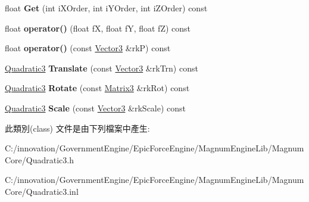 \begin{DoxyCompactItemize}
\item 
float {\bfseries Get} (int i\+X\+Order, int i\+Y\+Order, int i\+Z\+Order) const \hypertarget{class_i_dream_sky_1_1_quadratic3_a10728bfc6464745bdd09386a4bdb4a13}{}\label{class_i_dream_sky_1_1_quadratic3_a10728bfc6464745bdd09386a4bdb4a13}

\item 
float {\bfseries operator()} (float fX, float fY, float fZ) const \hypertarget{class_i_dream_sky_1_1_quadratic3_aca7c6466b899860b04295eeafb38caa7}{}\label{class_i_dream_sky_1_1_quadratic3_aca7c6466b899860b04295eeafb38caa7}

\item 
float {\bfseries operator()} (const \hyperlink{class_i_dream_sky_1_1_vector3}{Vector3} \&rkP) const \hypertarget{class_i_dream_sky_1_1_quadratic3_a3a4c43a7f7101155fb26da46d5a34a20}{}\label{class_i_dream_sky_1_1_quadratic3_a3a4c43a7f7101155fb26da46d5a34a20}

\item 
\hyperlink{class_i_dream_sky_1_1_quadratic3}{Quadratic3} {\bfseries Translate} (const \hyperlink{class_i_dream_sky_1_1_vector3}{Vector3} \&rk\+Trn) const \hypertarget{class_i_dream_sky_1_1_quadratic3_a91f3620744835c35b41366aa221a0971}{}\label{class_i_dream_sky_1_1_quadratic3_a91f3620744835c35b41366aa221a0971}

\item 
\hyperlink{class_i_dream_sky_1_1_quadratic3}{Quadratic3} {\bfseries Rotate} (const \hyperlink{class_i_dream_sky_1_1_matrix3}{Matrix3} \&rk\+Rot) const \hypertarget{class_i_dream_sky_1_1_quadratic3_adcbc9d302ba48b2dcef7afd119130e81}{}\label{class_i_dream_sky_1_1_quadratic3_adcbc9d302ba48b2dcef7afd119130e81}

\item 
\hyperlink{class_i_dream_sky_1_1_quadratic3}{Quadratic3} {\bfseries Scale} (const \hyperlink{class_i_dream_sky_1_1_vector3}{Vector3} \&rk\+Scale) const \hypertarget{class_i_dream_sky_1_1_quadratic3_a21cc78d9647509a43f99dbcba13477e0}{}\label{class_i_dream_sky_1_1_quadratic3_a21cc78d9647509a43f99dbcba13477e0}

\end{DoxyCompactItemize}


此類別(class) 文件是由下列檔案中產生\+:\begin{DoxyCompactItemize}
\item 
C\+:/innovation/\+Government\+Engine/\+Epic\+Force\+Engine/\+Magnum\+Engine\+Lib/\+Magnum\+Core/Quadratic3.\+h\item 
C\+:/innovation/\+Government\+Engine/\+Epic\+Force\+Engine/\+Magnum\+Engine\+Lib/\+Magnum\+Core/Quadratic3.\+inl\end{DoxyCompactItemize}

